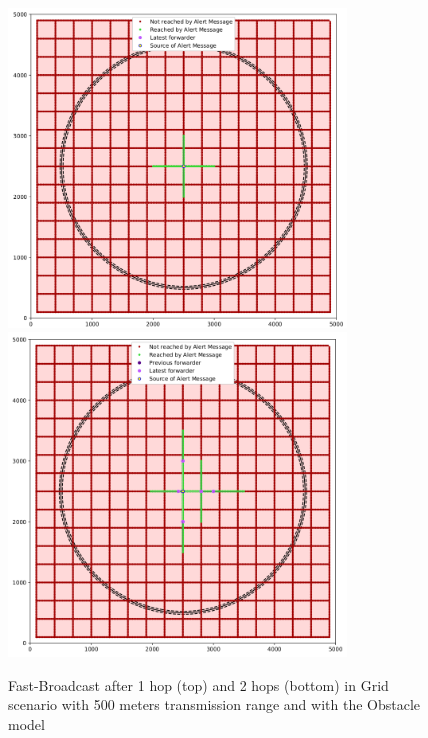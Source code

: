 		\begin{figure}[H]
			\centering
			\includegraphics[width=0.8\textwidth]{immagini/grid-300/b1/fb-1hop}
			\includegraphics[width=0.8\textwidth]{immagini/grid-300/b1/fb-2hop}
			\caption{Fast-Broadcast after 1 hop (top) and 2 hops (bottom) in Grid scenario with 500 meters transmission range and with the Obstacle model}
			\label{fig:fb-b1-grid-transmission} 
		\end{figure}
	
